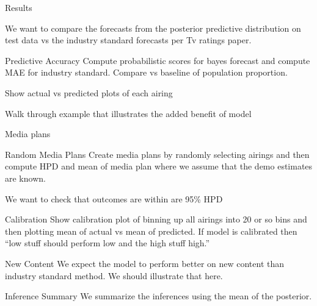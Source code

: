 \begin{chapter}{Results}

  We want to compare the forecasts from the posterior predictive distribution
  on test data vs the industry standard forecasts per Tv ratings paper.

  \begin{section}{Predictive Accuracy}
    Compute probabilistic scores for bayes forecast and compute MAE for industry
    standard. Compare vs baseline of population proportion.

    Show actual vs predicted plots of each airing

    Walk through example that illustrates the added benefit of model
  \end{section}

  \begin{section}{Media plans}

    \begin{subsection}{Random Media Plans}
      Create media plans by randomly selecting airings and then compute HPD and mean
      of media plan where we assume that the demo estimates are known.

      We want to check that outcomes are within are 95\% HPD
    \end{subsection}

    \begin{subsection}{Calibration}
      Show calibration plot of binning up all airings into 20 or so bins
      and then plotting mean of actual vs mean of predicted. If model is calibrated
      then ``low stuff should perform low and the high stuff high.''
    \end{subsection}
  \end{section}

  \begin{section}{New Content}
    We expect the model to perform better on new content than industry standard
    method. We should illustrate that here.
  \end{section}

  \begin{section}{Inference Summary}
    We summarize the inferences using the mean of the posterior.
  \end{section}

\end{chapter}